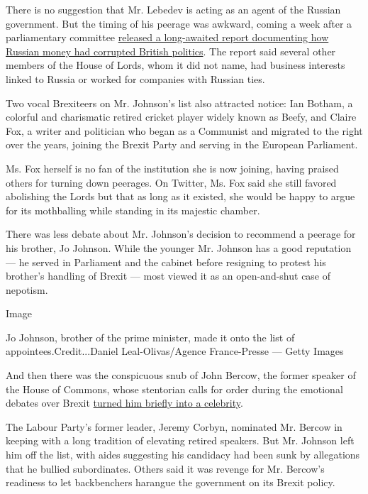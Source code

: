 There is no suggestion that Mr. Lebedev is acting as an agent of the
Russian government. But the timing of his peerage was awkward, coming a
week after a parliamentary committee
\href{https://www.nytimes3xbfgragh.onion/2020/07/21/world/europe/uk-russia-report-brexit-interference.html}{released
a long-awaited report documenting how Russian money had corrupted
British politics}. The report said several other members of the House of
Lords, whom it did not name, had business interests linked to Russia or
worked for companies with Russian ties.

Two vocal Brexiteers on Mr. Johnson's list also attracted notice: Ian
Botham, a colorful and charismatic retired cricket player widely known
as Beefy, and Claire Fox, a writer and politician who began as a
Communist and migrated to the right over the years, joining the Brexit
Party and serving in the European Parliament.

Ms. Fox herself is no fan of the institution she is now joining, having
praised others for turning down peerages. On Twitter, Ms. Fox said she
still favored abolishing the Lords but that as long as it existed, she
would be happy to argue for its mothballing while standing in its
majestic chamber.

There was less debate about Mr. Johnson's decision to recommend a
peerage for his brother, Jo Johnson. While the younger Mr. Johnson has a
good reputation --- he served in Parliament and the cabinet before
resigning to protest his brother's handling of Brexit --- most viewed it
as an open-and-shut case of nepotism.

Image

Jo Johnson, brother of the prime minister, made it onto the list of
appointees.Credit...Daniel Leal-Olivas/Agence France-Presse --- Getty
Images

And then there was the conspicuous snub of John Bercow, the former
speaker of the House of Commons, whose stentorian calls for order during
the emotional debates over Brexit
\href{https://www.nytimes3xbfgragh.onion/2019/10/31/world/europe/british-parliament-speaker-john-bercow-resigns.html}{turned
him briefly into a celebrity}.

The Labour Party's former leader, Jeremy Corbyn, nominated Mr. Bercow in
keeping with a long tradition of elevating retired speakers. But Mr.
Johnson left him off the list, with aides suggesting his candidacy had
been sunk by allegations that he bullied subordinates. Others said it
was revenge for Mr. Bercow's readiness to let backbenchers harangue the
government on its Brexit policy.

